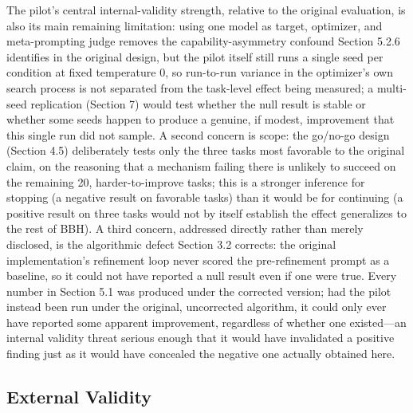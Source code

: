 \documentclass[a4paper,fleqn]{cas-sc}
\begin{document}
The pilot's central internal-validity strength, relative to the original evaluation, is also its main remaining limitation: using one model as target, optimizer, and meta-prompting judge removes the capability-asymmetry confound Section 5.2.6 identifies in the original design, but the pilot itself still runs a single seed per condition at fixed temperature 0, so run-to-run variance in the optimizer's own search process is not separated from the task-level effect being measured; a multi-seed replication (Section 7) would test whether the null result is stable or whether some seeds happen to produce a genuine, if modest, improvement that this single run did not sample. A second concern is scope: the go/no-go design (Section 4.5) deliberately tests only the three tasks most favorable to the original claim, on the reasoning that a mechanism failing there is unlikely to succeed on the remaining 20, harder-to-improve tasks; this is a stronger inference for stopping (a negative result on favorable tasks) than it would be for continuing (a positive result on three tasks would not by itself establish the effect generalizes to the rest of BBH). A third concern, addressed directly rather than merely disclosed, is the algorithmic defect Section 3.2 corrects: the original implementation's refinement loop never scored the pre-refinement prompt as a baseline, so it could not have reported a null result even if one were true. Every number in Section 5.1 was produced under the corrected version; had the pilot instead been run under the original, uncorrected algorithm, it could only ever have reported some apparent improvement, regardless of whether one existed---an internal validity threat serious enough that it would have invalidated a positive finding just as it would have concealed the negative one actually obtained here.

\subsection{External Validity}
\end{document}
